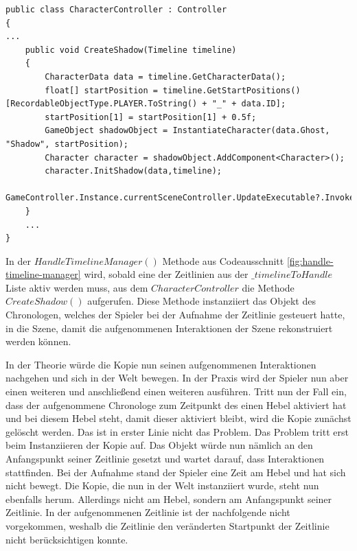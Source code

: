 \begin{lstlisting}[caption={Ausschnitt aus CharacterController.cs}, label={lst:character-controller}]
public class CharacterController : Controller
{
...
    public void CreateShadow(Timeline timeline)
    {
        CharacterData data = timeline.GetCharacterData();
        float[] startPosition = timeline.GetStartPositions()[RecordableObjectType.PLAYER.ToString() + "_" + data.ID];
        startPosition[1] = startPosition[1] + 0.5f;
        GameObject shadowObject = InstantiateCharacter(data.Ghost, "Shadow", startPosition);
        Character character = shadowObject.AddComponent<Character>();
        character.InitShadow(data,timeline);
        GameController.Instance.currentSceneController.UpdateExecutable?.Invoke();
    }
    ...
}

\end{lstlisting}

In der $HandleTimelineManager()$ Methode aus Codeausschnitt \ref{fig:handle-timeline-manager} wird, sobald eine der Zeitlinien aus der $\_timelineToHandle$ Liste aktiv werden muss, aus dem $CharacterController$ die Methode $CreateShadow()$ aufgerufen. Diese Methode instanziiert das Objekt des Chronologen, welches der Spieler bei der Aufnahme der Zeitlinie gesteuert hatte, in die Szene, damit die aufgenommenen Interaktionen der Szene rekonstruiert werden können.

In der Theorie würde die Kopie nun seinen aufgenommenen Interaktionen nachgehen und sich in der Welt bewegen. 
In der Praxis wird der Spieler nun aber einen weiteren  und anschließend einen weiteren  ausführen. Tritt nun der Fall ein, dass der aufgenommene Chronologe zum Zeitpunkt des  einen Hebel aktiviert hat und bei diesem Hebel steht, damit dieser aktiviert bleibt, wird die Kopie zunächst gelöscht werden. Das ist in erster Linie nicht das Problem. Das Problem tritt erst beim Instanziieren der Kopie auf. Das Objekt würde nun nämlich an den Anfangspunkt seiner Zeitlinie gesetzt und wartet darauf, dass Interaktionen stattfinden. Bei der Aufnahme stand der Spieler eine Zeit am Hebel und hat sich nicht bewegt. Die Kopie, die nun in der Welt instanziiert wurde, steht nun ebenfalls herum. Allerdings nicht am Hebel, sondern am Anfangspunkt seiner Zeitlinie. In der aufgenommenen Zeitlinie ist der nachfolgende  nicht vorgekommen, weshalb die Zeitlinie den veränderten Startpunkt der Zeitlinie nicht berücksichtigen konnte. 


